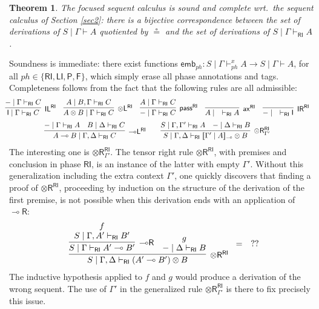 \documentclass[copyright,creativecommons]{eptcs}
\newtheorem{theorem}{Theorem}[section]
\theoremstyle{definition}
\newcommand{\ldbc}{[\![}
\newcommand{\rdbc}{]\!]}
\newcommand{\tl}{\otimes \mathsf{L}}
\newcommand{\tr}{\otimes \mathsf{R}}
\newcommand{\lright}{{\multimap}\mathsf{R}}
\newcommand{\lleft}{{\multimap}\mathsf{L}}
\newcommand{\pass}{\mathsf{pass}}
\newcommand{\unitl}{\mathsf{IL}}
\newcommand{\unitr}{\mathsf{IR}}
\newcommand{\ax}{\mathsf{ax}}
\newcommand{\ot}{\otimes}
\newcommand{\lolli}{\multimap}
\newcommand{\I}{\mathsf{I}}
\newcommand{\RI}{\mathsf{RI}}
\newcommand{\LI}{\mathsf{LI}}
\newcommand{\Pass}{\mathsf{P}}
\newcommand{\F}{\mathsf{F}}
\newcommand{\proofbox}[1]{\begin{tabular}{l} #1 \end{tabular}}
\newcommand{\SkNMILL}{$\mathtt{SkNMILL}$}
\begin{document}
 \begin{theorem}
   The focused sequent calculus is sound and complete wrt.\ the  sequent calculus of Section \ref{sec2}: there is a bijective correspondence between the set of derivations of $S \mid \Gamma \vdash A$ quotiented by $\circeq$ and the set of derivations of $S \mid \Gamma \vdash_\RI A$.
 \end{theorem}
Soundness is immediate: there exist functions $\mathsf{emb}_{ph} : S \mid \Gamma \vdash^x_{ph} A \to S \mid \Gamma \vdash A$, for all $ph \in \{\RI,\LI,\Pass, \F \}$, which simply erase all phase annotations and tags. Completeness follows from the fact that the following rules are all admissible:
\begin{equation}\label{eq:admis}
\hspace*{-4mm}
  \begin{array}{c}
    \infer[\unitl^{\RI}]{\I \mid \Gamma \vdash_{\RI} C}{{-} \mid \Gamma \vdash_{\RI} C}
    \quad
    \infer[\tl^{\RI}]{A \ot B \mid \Gamma \vdash_{\RI} C}{A \mid B, \Gamma \vdash_{\RI} C}
    \quad
    \infer[\pass^{\RI}]{{-} \mid \Gamma \vdash_{\RI} C}{A \mid \Gamma \vdash_{\RI} C}
    \quad
    \infer[\ax^{\RI}]{A \mid \quad \vdash_{\RI} A}{}
    \quad
    \infer[\unitr^{\RI}]{{-} \mid \quad \vdash_{\RI} \I}{}
\\[6pt]
    \infer[\lleft^{\RI}]{A \lolli B \mid \Gamma , \Delta \vdash_{\RI} C}{
    {-} \mid \Gamma \vdash_{\RI} A
    &
    B \mid \Delta \vdash_{\RI} C
    }
    \qquad
    \infer[\tr_{\Gamma'}^{\RI}]{S \mid \Gamma , \Delta \vdash_{\RI} \ldbc \Gamma' \mid A \rdbc_{\lolli} \ot B}{
      S \mid \Gamma , \Gamma' \vdash_{\RI} A
      &
      {-} \mid \Delta \vdash_{\RI} B
    }
  \end{array}
\end{equation}
The interesting one is $\tr_{\Gamma'}^{\RI}$. The tensor right rule $\tr^\RI$, with premises and conclusion in phase $\RI$, is an instance of the latter with empty $\Gamma'$.
Without this generalization including the extra context $\Gamma'$, one quickly discovers that finding a proof of $\tr^\RI$, proceeding by induction on the structure of the derivation of the first premise, is not possible when this derivation ends with an application of $\lright$:
\vspace{-.3cm}
\begin{displaymath}
  \proofbox{
    \infer[\tr^{\RI}]{S \mid \Gamma , \Delta \vdash_{\RI} (A' \lolli B') \ot B}{
    \infer[\lright]{S \mid \Gamma \vdash_{\RI} A' \lolli B'}{
      \deduce{S \mid \Gamma , A' \vdash_{\RI} B'}{f}
    }
    &
    \deduce{{-} \mid \Delta \vdash_{\RI} B}{g}
    }
    } = \quad ??
\end{displaymath}
The inductive hypothesis applied to $f$ and $g$ would produce a derivation of the wrong sequent. The use of $\Gamma'$ in the generalized rule $\tr_{\Gamma'}^{\RI}$ is there to fix precisely this issue.
\end{document}
